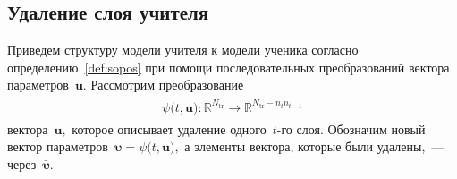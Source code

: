 \documentclass[12pt]{a&t}
\begin{document}
\subsection{Удаление слоя учителя}
Приведем структуру модели учителя к модели ученика согласно определению~\ref{def:sopos} при помощи последовательных преобразований вектора параметров~$\mathbf{u}$. Рассмотрим преобразование
\begin{gather}
\label{eq:ap:4}
\begin{aligned}
\psi\bigr(t, \mathbf{u}\bigr) : \mathbb{R}^{N_{\text{tr}}} \to \mathbb{R}^{N_{\text{tr}}-n_tn_{t-1}}
\end{aligned}
\end{gather}
вектора~$\mathbf{u},$ которое описывает удаление одного~$t$-го слоя.
Обозначим новый вектор параметров~$\bm{\upsilon} = \psi\bigr(t, \mathbf{u}\bigr),$ а элементы вектора, которые были удалены,~--- через~$\bar{\bm{\upsilon}}.$ 
\end{document}
